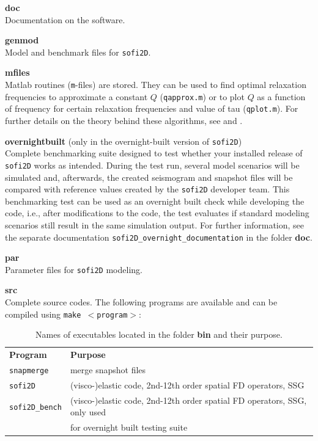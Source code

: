 \documentclass[11pt,english,a4paper]{article}
\begin{document}
\textbf{doc}\\
Documentation on the software.

\textbf{genmod}\\
Model and benchmark files for \texttt{sofi2D}.

\textbf{mfiles}\\
Matlab routines (\texttt{m}-files) are stored. They can be used to find optimal relaxation frequencies to approximate a constant $Q$ (\texttt{qapprox.m}) or to plot $Q$ as a function of frequency for
certain relaxation frequencies and value of tau (\texttt{qplot.m}). For further details on the theory behind these algorithms, see \citet{bohlen:98} and \citet{blanch:95}. 

\textbf{overnightbuilt} (only in the overnight-built version of \texttt{sofi2D})\\
Complete benchmarking suite designed to test whether your installed release of \texttt{sofi2D} works as intended. During the test run, several model scenarios will be simulated and, afterwards, the created seismogram and snapshot files will be compared with reference values created by the \texttt{sofi2D} developer team. This benchmarking test can be used as an overnight built check while developing the code, i.e., after modifications to the code, the test evaluates if standard modeling scenarios still result in the same simulation output. For further information, see the separate documentation \texttt{sofi2D\_overnight\_documentation} in the folder \textbf{doc}.

\textbf{par}\\
Parameter files for \texttt{sofi2D} modeling.

\textbf{src}\\
Complete source codes. The following programs are available and can be compiled using \texttt{make $<$program$>$}:

\begin{table}[hbt]
\caption{Names of executables located in the folder \textbf{bin} and their purpose.}
\begin{tabular}{ll}
\textbf{Program} & \textbf{Purpose} \\ 
\texttt{snapmerge} & merge snapshot files \\
\texttt{sofi2D} & (visco-)elastic code, 2nd-12th order spatial FD operators, SSG \\
\texttt{sofi2D\_bench} & (visco-)elastic code, 2nd-12th order spatial FD operators, SSG, only used \\
& for overnight built testing suite \\
\end{tabular}
\label{tab_programs}
\end{table}
\end{document}
